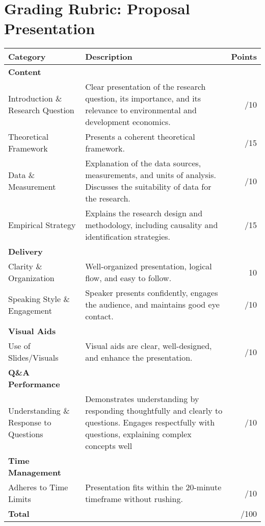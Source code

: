 \documentclass[
]{article}
\begin{document}
\clearpage

\hypertarget{grading-rubric-proposal-presentation}{%
\section{Grading Rubric: Proposal Presentation}\label{grading-rubric-proposal-presentation}}

\begin{table}[h!]
\centering
\begin{tabular}{|p{4cm}|p{8cm}|r|}
\hline
\textbf{Category} & \textbf{Description} & \textbf{Points} \\ \hline
\textbf{Content} &  &  \\ \hline
Introduction \& Research Question & Clear presentation of the research question, its importance, and its relevance to environmental and development economics. & /10 \\ \hline
Theoretical Framework & Presents a coherent theoretical framework. & /15 \\ \hline
Data \& Measurement & Explanation of the data sources, measurements, and units of analysis. Discusses the suitability of data for the research. & /10 \\ \hline
Empirical Strategy & Explains the research design and methodology, including causality and identification strategies. & /15 \\ \hline
\textbf{Delivery} &  &  \\ \hline
Clarity \& Organization & Well-organized presentation, logical flow, and easy to follow. & 10 \\ \hline
Speaking Style \& Engagement & Speaker presents confidently, engages the audience, and maintains good eye contact. & /10 \\ \hline
\textbf{Visual Aids} &  &  \\ \hline
Use of Slides/Visuals & Visual aids are clear, well-designed, and enhance the presentation. & /10 \\ \hline
\textbf{Q\&A Performance} &  &  \\ \hline
Understanding \& Response to Questions & Demonstrates understanding by responding thoughtfully and clearly to questions. Engages respectfully with questions, explaining complex concepts well & /10 \\ \hline
\textbf{Time Management} &  &  \\ \hline
Adheres to Time Limits & Presentation fits within the 20-minute timeframe without rushing. & /10 \\ \hline
\textbf{Total} &  & /100  \\ \hline
\end{tabular}
\end{table}
\end{document}

